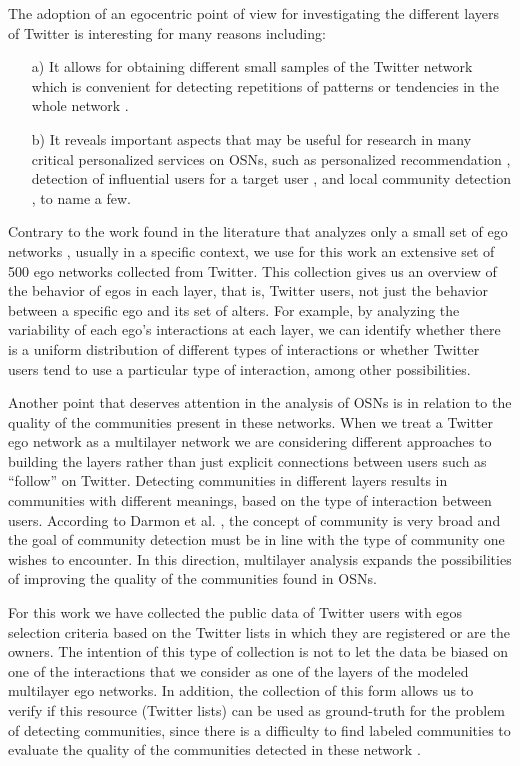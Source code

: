 The adoption of an egocentric point of view for investigating the different layers of Twitter is interesting for many reasons including: 
\begin{itemize}
\item [a)] It allows for obtaining different small samples of the Twitter network which is convenient for detecting repetitions of patterns or tendencies in the whole network \cite{Leskovec2012}. 
\item [b)] It reveals important aspects that may be useful for research in many critical personalized services on OSNs, such as personalized recommendation \cite{Hong:2013,Chen2012}, detection of influential users for a target user \cite{Guo:2013}, and local community detection \cite{McAuley:2012,Coscia:2014}, to name a few.  
\end{itemize}

Contrary to the work found in the literature that analyzes only a small set of ego networks \cite{Achiam2016,Omodei2015,Leskovec2012,Epasto2015,Dykstra2014}, usually in a specific context, we use for this work an extensive set of 500 ego networks collected from Twitter. This collection gives us an overview of the behavior of egos in each layer, that is, Twitter users, not just the behavior between a specific ego and its set of alters. For example, by analyzing the variability of each ego's interactions at each layer, we can identify whether there is a uniform distribution of different types of interactions or whether Twitter users tend to use a particular type of interaction, among other possibilities.

Another point that deserves attention in the analysis of OSNs is in relation to the quality of the communities present in these networks. When we treat a Twitter ego network as a multilayer network we are considering different approaches to building the layers rather than just explicit connections between users such as ``follow'' on Twitter. Detecting communities in different layers results in communities with different meanings, based on the type of interaction between users. According to Darmon et al. \cite{Darmon2015}, the concept of community is very broad and the goal of community detection must be in line with the type of community one wishes to encounter. In this direction, multilayer analysis expands the possibilities of improving the quality of the communities found in OSNs.

For this work we have collected the public data of Twitter users with egos selection criteria based on the Twitter lists in which they are registered or are the owners. The intention of this type of collection is not to let the data be biased on one of the interactions that we consider as one of the layers of the modeled multilayer ego networks. In addition, the collection of this form allows us to verify if this resource (Twitter lists) can be used as ground-truth for the problem of detecting communities, since there is a difficulty to find labeled communities to evaluate the quality of the communities detected in these network \cite{Xie2013,Wang2014,Zafarani2014,Zafarani2015}.

